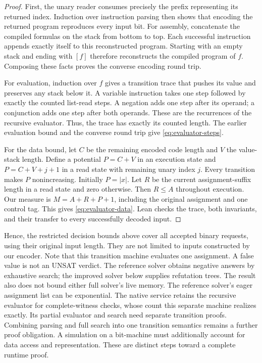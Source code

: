\documentclass[11pt,a4paper]{article}
\numberwithin{equation}{section}
\theoremstyle{plain}
\theoremstyle{definition}
\theoremstyle{remark}
\begin{document}
\begin{proof}
First, the unary reader consumes precisely the prefix representing its returned index. Induction over instruction parsing then shows that encoding the returned program reproduces every input bit. For assembly, concatenate the compiled formulas on the stack from bottom to top. Each successful instruction appends exactly itself to this reconstructed program. Starting with an empty stack and ending with $[f]$ therefore reconstructs the compiled program of $f$. Composing these facts proves the converse encoding round trip.

For evaluation, induction over $f$ gives a transition trace that pushes its value and preserves any stack below it. A variable instruction takes one step followed by exactly the counted list-read steps. A negation adds one step after its operand; a conjunction adds one step after both operands. These are the recurrences of the recursive evaluator. Thus, the trace has exactly its counted length. The earlier evaluation bound and the converse round trip give \eqref{eq:evaluator-steps}.

For the data bound, let $C$ be the remaining encoded code length and $V$ the value-stack length. Define a potential $P=C+V$ in an execution state and $P=C+V+j+1$ in a read state with remaining unary index $j$. Every transition makes $P$ nonincreasing. Initially $P=|x|$. Let $R$ be the current assignment-suffix length in a read state and zero otherwise. Then $R\leq A$ throughout execution. Our measure is $M=A+R+P+1$, including the original assignment and one control tag. This gives \eqref{eq:evaluator-data}. Lean checks the trace, both invariants, and their transfer to every successfully decoded input.
\end{proof}

Hence, the restricted decision bounds above cover all accepted binary requests, using their original input length. They are not limited to inputs constructed by our encoder. Note that this transition machine evaluates one assignment. A false value is not an UNSAT verdict. The reference solver obtains negative answers by exhaustive search; the improved solver below supplies refutation trees. The result also does not bound either full solver's live memory. The reference solver's eager assignment list can be exponential. The native service retains the recursive evaluator for complete-witness checks, whose count this separate machine realizes exactly. Its partial evaluator and search need separate transition proofs. Combining parsing and full search into one transition semantics remains a further proof obligation. A simulation on a bit-machine must additionally account for data access and representation. These are distinct steps toward a complete runtime proof.
\end{document}
